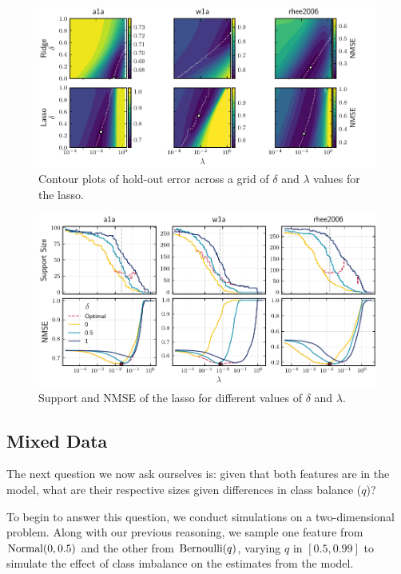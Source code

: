 \begin{figure}[htpb]
  \centering
  \includegraphics[]{plots/hyperopt_surfaces.pdf}
  \caption{%
    Contour plots of hold-out error across a grid of \(\delta\) and \(\lambda\) values for the
    lasso.
  }
  \label{fig:hyperopt-contours}
\end{figure}

\begin{figure}[htpb]
  \centering
  \includegraphics[]{plots/hyperopt_paths.pdf}
  \caption{%
    Support and NMSE of the lasso for different values of \(\delta\) and \(\lambda\).
  }
  \label{fig:hyperopt-support}
\end{figure}

\subsection{Mixed Data}

The next question we now ask ourselves is: given that both features are in the model, what are their respective sizes given differences in class balance (\(q\))?

To begin to answer this question, we conduct simulations on a two-dimensional problem. Along with our previous reasoning, we sample one feature from \(\operatorname{Normal}(0, 0.5)\) and the other from \(\operatorname{Bernoulli}(q)\), varying \(q\) in \([0.5, 0.99]\) to simulate the effect of class imbalance on the estimates from the model.

